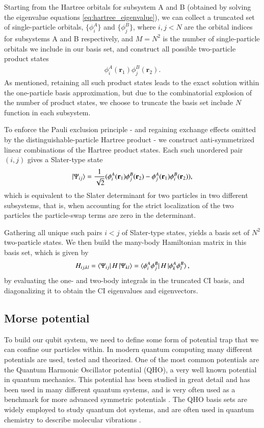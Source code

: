 \documentclass{subfiles}
\begin{document}
Starting from the Hartree orbitals for subsystem A and B (obtained by solving the eigenvalue equations \ref{eq:hartree_eigenvalue}), we can collect a truncated set of single-particle orbitals, $\{\phi^A_i\}$ and $\{\phi^B_j\}$, where $i,j<N$ are the orbital indices for subsystems A and B respectively, and $M=N^2$ is the number of single-particle orbitals we include in our basis set, and construct all possible two-particle product states
\begin{align*}
    \phi_i^A(\mathbf{r}_1)\phi_j^B(\mathbf{r}_2).
\end{align*}  
As mentioned, retaining all such product states leads to the exact solution within the one-particle basis approximation, but due to the combinatorial explosion of the number of product states, we choose to truncate the basis set include $N$ function in each subsystem. 

To enforce the Pauli exclusion principle - and regaining exchange effects omitted by the distinguishable-particle Hartree product - we construct anti-symmetrized linear combinations of the Hartree product states. Each such unordered pair $(i,j)$ gives a Slater-type state
\begin{align*}
    \ket{\Psi_{ij}} = \frac{1}{\sqrt{2}}(\phi_i^A(\mathbf{r}_1)\phi_j^B(\mathbf{r}_2) - \phi_j^A(\mathbf{r}_1)\phi_i^B(\mathbf{r}_2)),
\end{align*}
which is equivalent to the Slater determinant for two particles in two different subsystems, that is, when accounting for the strict localization of the two particles the particle-swap terms are zero in the determinant. 

Gathering all unique such pairs $i<j$ of Slater-type states, yields a basis set of $N^2$ two-particle states. We then build the many-body Hamiltonian matrix in this basis set, which is given by
\begin{align*}
    H_{ij,kl} = \bra{\Psi_{ij}}H\ket{\Psi_{kl}} = \bra{\phi_i^A\phi_j^B}H\ket{\phi_k^A\phi_l^B},
\end{align*}
by evaluating the one- and two-body integrals in the truncated CI basis, and diagonalizing it to obtain the CI eigenvalues and eigenvectors. 

\subsection{Morse potential}\label{sec:morse_potential}
To build our qubit system, we need to define some form of potential trap that we can confine our particles within. In modern quantum computing many different potentials are used, tested and theorized. One of the most common potentials are the Quantum Harmonic Oscillator potential (QHO), a very well known potential in quantum mechanics. This potential has been studied in great detail and has been used in many different quantum systems, and is very often used as a benchmark for more advanced symmetric potentials \cite{griffiths2018introduction, berera2021quantum}. The QHO basis sets are widely employed to study quantum dot systems\cite{Yuan_2017}, and are often used in quantum chemistry to describe molecular vibrations \cite{atkins2011molecular}. 
\\ 
\end{document}
